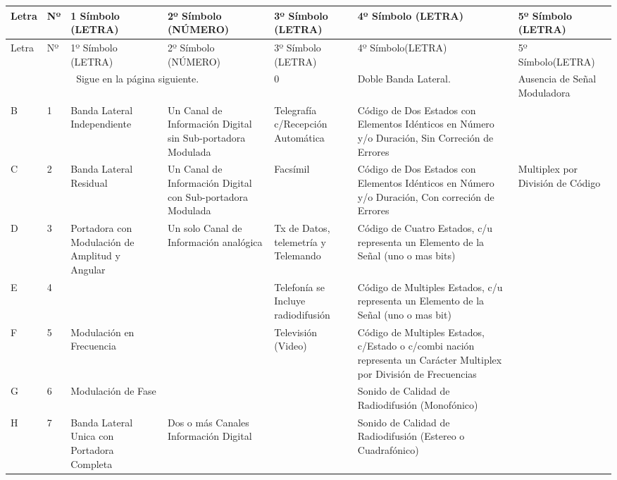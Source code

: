 \begin{longtable}{|p{0.8cm}|p{0.3cm}|p{2cm}|p{2cm}|p{2cm}|p{2cm}|p{2cm}|}
\hline
Letra & Nº & 1 Símbolo (LETRA) & 2º Símbolo (NÚMERO) & 3º Símbolo (LETRA) & 4º Símbolo (LETRA) & 5º Símbolo (LETRA) \\ 
\hline \hline
\endfirsthead

\hline
Letra & Nº & 1º Símbolo (LETRA) & 2º Símbolo (NÚMERO) & 3º Símbolo (LETRA) & 4º Símbolo(LETRA) & 5º Símbolo(LETRA) \\ 
\hline \hline
\endhead

\multicolumn{4}{c}{Sigue en la página siguiente.}
\endfoot

\endlastfoot

A & 0 & Doble Banda Lateral. & Ausencia de Señal Moduladora & Telegrafía c/ Recepción Acústica & Código de Dos Estados con Elementos que difieren en número y/o en Duración &  \\ \hline
B & 1 & Banda Lateral Independiente & Un Canal de Información Digital sin Sub-portadora Modulada & Telegrafía c/Recepción Automática & Código de Dos Estados con Elementos Idénticos en Número y/o Duración, Sin Correción de Errores &  \\ \hline
C & 2 & Banda Lateral Residual & Un Canal de Información Digital con Sub-portadora Modulada & Facsímil & Código de Dos Estados con Elementos Idénticos en Número y/o Duración, Con correción de Errores & Multiplex por División de Código \\ \hline
D & 3 & Portadora con Modulación de Amplitud y Angular & Un solo Canal de Información analógica & Tx de Datos,  telemetría y Telemando & Código de Cuatro Estados, c/u representa  un Elemento  de  la Señal (uno o mas bits) &  \\ \hline
E & 4 &  &  & Telefonía se Incluye  radiodifusión & Código de Multiples Estados, c/u representa un Elemento de la Señal (uno o mas bit) &  \\ \hline
F & 5 & Modulación en Frecuencia &  & Televisión (Video) & Código de Multiples Estados, c/Estado o c/combi nación  representa un Carácter Multiplex por División de Frecuencias  & \\ \hline
G & 6 & Modulación de Fase &  &  & Sonido de Calidad de Radiodifusión (Monofónico) &  \\ \hline
H & 7 & Banda Lateral Unica con Portadora Completa & Dos o más Canales Información Digital &  & Sonido de Calidad de Radiodifusión (Estereo o  Cuadrafónico) &  \\ \hline

\end{longtable}
